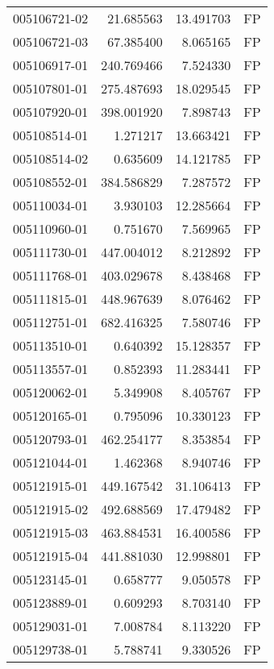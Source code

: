 \begin{tabular}{lrrl}
005106721-02 &   21.685563 &      13.491703 &   FP \\
005106721-03 &   67.385400 &       8.065165 &   FP \\
005106917-01 &  240.769466 &       7.524330 &   FP \\
005107801-01 &  275.487693 &      18.029545 &   FP \\
005107920-01 &  398.001920 &       7.898743 &   FP \\
005108514-01 &    1.271217 &      13.663421 &   FP \\
005108514-02 &    0.635609 &      14.121785 &   FP \\
005108552-01 &  384.586829 &       7.287572 &   FP \\
005110034-01 &    3.930103 &      12.285664 &   FP \\
005110960-01 &    0.751670 &       7.569965 &   FP \\
005111730-01 &  447.004012 &       8.212892 &   FP \\
005111768-01 &  403.029678 &       8.438468 &   FP \\
005111815-01 &  448.967639 &       8.076462 &   FP \\
005112751-01 &  682.416325 &       7.580746 &   FP \\
005113510-01 &    0.640392 &      15.128357 &   FP \\
005113557-01 &    0.852393 &      11.283441 &   FP \\
005120062-01 &    5.349908 &       8.405767 &   FP \\
005120165-01 &    0.795096 &      10.330123 &   FP \\
005120793-01 &  462.254177 &       8.353854 &   FP \\
005121044-01 &    1.462368 &       8.940746 &   FP \\
005121915-01 &  449.167542 &      31.106413 &   FP \\
005121915-02 &  492.688569 &      17.479482 &   FP \\
005121915-03 &  463.884531 &      16.400586 &   FP \\
005121915-04 &  441.881030 &      12.998801 &   FP \\
005123145-01 &    0.658777 &       9.050578 &   FP \\
005123889-01 &    0.609293 &       8.703140 &   FP \\
005129031-01 &    7.008784 &       8.113220 &   FP \\
005129738-01 &    5.788741 &       9.330526 &   FP \\

\end{tabular}
